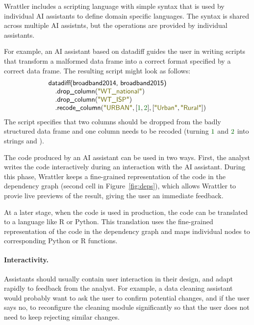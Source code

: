 \documentclass[sigplan,preprint,10pt]{acmart}\settopmatter{printfolios=true,printccs=false,printacmref=false}
\theoremstyle{plain}
\theoremstyle{definition}
\newcommand{\num}[1]{\textcolor{numclr}{#1}}
\newcommand{\str}[1]{\textnormal{\textcolor{strclr}{\sffamily "#1"}}}
\newcommand{\ident}[1]{\textnormal{\sffamily #1}}
\begin{document}
{Wrattler includes a scripting language with simple syntax that is used by individual AI assistants
to define domain specific languages. The syntax is shared across multiple AI assistnts, but the
operations are provided by individual assistants.

For example, an AI assistant based on datadiff
guides the user in writing scripts that transform a malformed data frame into a correct format
specified by a correct data frame. The resulting script might look as follows:
%
\begin{equation*}
\begin{array}{l}
\ident{datadiff(broadband2014, broadband2015)}\\
\quad.\ident{drop\_column}(\str{WT\_national})\\
\quad.\ident{drop\_column}(\str{WT\_ISP})\\
\quad.\ident{recode\_column}(\str{URBAN}, [\num{1}, \num{2}], [\str{Urban},\str{Rural}])
\end{array}
\end{equation*}
%
The script specifies that two columns should be dropped from the badly structured data frame and
one column needs to be recoded (turning $\num{1}$ and $\num{2}$ into strings
 and ).

The code produced by an AI assistant can be used in two ways. First, the analyst writes the code
interactively during an interaction with the AI assistant. During this phase, Wrattler
keeps a fine-grained representation of the code in the dependency graph (second cell in
Figure~\ref{fig:deps}), which allows Wrattler to provie live previews of the result, giving the
user an immediate feedback.

At a later stage, when the code is used in production, the code can be translated to a language
like R or Python. This translation uses the fine-grained representation of the code in the
dependency graph and maps individual nodes to corresponding Python or R functions.

\paragraph{Interactivity.}

Assistants should usually contain user interaction in their design, and adapt rapidly to feedback
from the analyst. For example, a data cleaning assistant would probably want to ask the user to
confirm potential changes, and if the user says no, to reconfigure the cleaning module
significantly so that the user does not need to keep rejecting similar changes.

}
\end{document}
